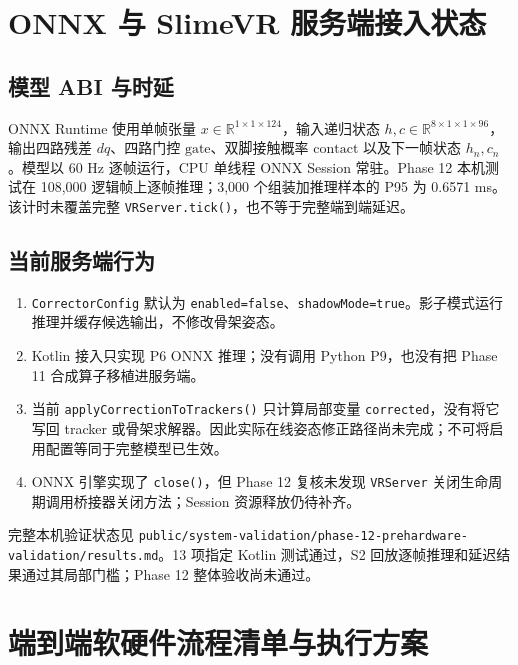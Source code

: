 \documentclass[UTF8,11pt,a4paper]{ctexart}
\begin{document}
\section{ONNX 与 SlimeVR 服务端接入状态}

\subsection{模型 ABI 与时延}
ONNX Runtime 使用单帧张量 \(x\in\mathbb{R}^{1\times1\times124}\)，输入递归状态 \(h,c\in\mathbb{R}^{8\times1\times1\times96}\)，输出四路残差 \(dq\)、四路门控 \(\mathrm{gate}\)、双脚接触概率 \(\mathrm{contact}\) 以及下一帧状态 \(h_n,c_n\)。模型以 60 Hz 逐帧运行，CPU 单线程 ONNX Session 常驻。Phase 12 本机测试在 108,000 逻辑帧上逐帧推理；3,000 个组装加推理样本的 P95 为 0.6571 ms。该计时未覆盖完整 \texttt{VRServer.tick()}，也不等于完整端到端延迟。

\subsection{当前服务端行为}
\begin{enumerate}
  \item \texttt{CorrectorConfig} 默认为 \texttt{enabled=false}、\texttt{shadowMode=true}。影子模式运行推理并缓存候选输出，不修改骨架姿态。
  \item Kotlin 接入只实现 P6 ONNX 推理；没有调用 Python P9，也没有把 Phase 11 合成算子移植进服务端。
  \item 当前 \texttt{applyCorrectionToTrackers()} 只计算局部变量 \texttt{corrected}，没有将它写回 tracker 或骨架求解器。因此实际在线姿态修正路径尚未完成；不可将启用配置等同于完整模型已生效。
  \item ONNX 引擎实现了 \texttt{close()}，但 Phase 12 复核未发现 \texttt{VRServer} 关闭生命周期调用桥接器关闭方法；Session 资源释放仍待补齐。
\end{enumerate}
完整本机验证状态见 \texttt{public/system-validation/phase-12-prehardware-validation/results.md}。13 项指定 Kotlin 测试通过，S2 回放逐帧推理和延迟结果通过其局部门槛；Phase 12 整体验收尚未通过。

\section{端到端软硬件流程清单与执行方案}
\label{sec:end_to_end_plan}
\end{document}
